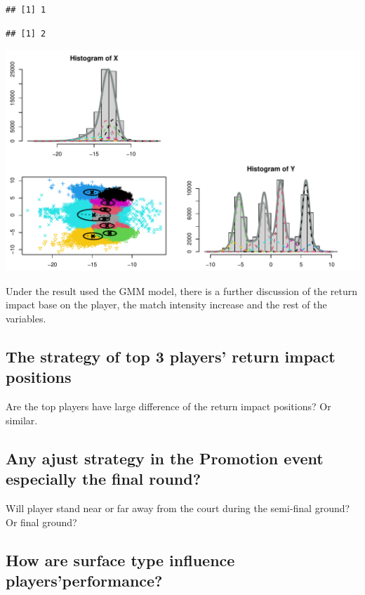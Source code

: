 \documentclass[11pt,a4paper,]{article}
\begin{document}
\begin{verbatim}
## [1] 1
\end{verbatim}

\begin{verbatim}
## [1] 2
\end{verbatim}

\includegraphics{Report_files/figure-latex/unnamed-chunk-3-1.pdf}

Under the result used the GMM model, there is a further discussion of the return impact base on the player, the match intensity increase and the rest of the variables.

\hypertarget{the-strategy-of-top-3-players-return-impact-positions}{%
\subsection{The strategy of top 3 players' return impact positions}\label{the-strategy-of-top-3-players-return-impact-positions}}

Are the top players have large difference of the return impact positions? Or similar.

\hypertarget{any-ajust-strategy-in-the-promotion-event-especially-the-final-round}{%
\subsection{Any ajust strategy in the Promotion event especially the final round?}\label{any-ajust-strategy-in-the-promotion-event-especially-the-final-round}}

Will player stand near or far away from the court during the semi-final ground? Or final ground?

\hypertarget{how-are-surface-type-influence-playersperformance}{%
\subsection{How are surface type influence players'performance?}\label{how-are-surface-type-influence-playersperformance}}
\end{document}
